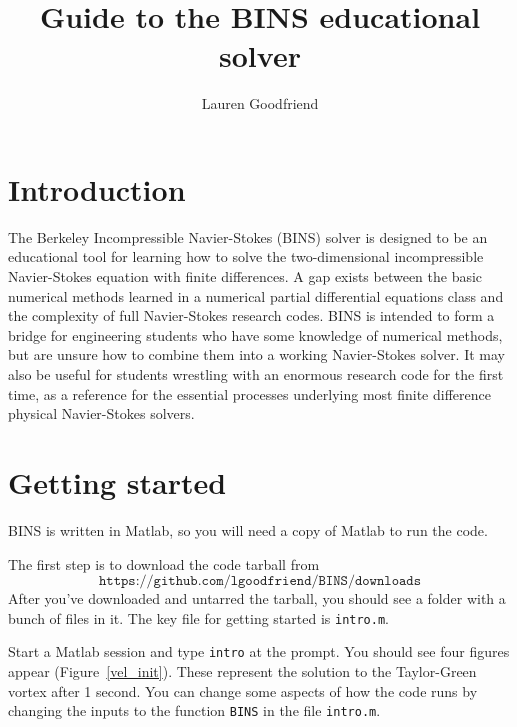 \documentclass[12pt]{article}
\author{Lauren Goodfriend}
\title{Guide to the BINS educational solver}
\begin{document}
\maketitle
\tableofcontents

\section{Introduction}

The Berkeley Incompressible Navier-Stokes (BINS) solver is designed to be an educational tool for learning how to solve the two-dimensional incompressible Navier-Stokes equation with finite differences.  A gap exists between the basic numerical methods learned in a numerical partial differential equations class and the complexity of full Navier-Stokes research codes.  BINS is intended to form a bridge for engineering students who have some knowledge of numerical methods, but are unsure how to combine them into a working Navier-Stokes solver.  It may also be useful for students wrestling with an enormous research code for the first time, as a reference for the essential processes underlying most finite difference physical Navier-Stokes solvers.

\section{Getting started}

BINS is written in Matlab, so you will need a copy of Matlab to run the code.

The first step is to download the code tarball from \[ \texttt{https://github.com/lgoodfriend/BINS/downloads}\]  After you've downloaded and untarred the tarball, you should see a folder with a bunch of files in it.  The key file for getting started is \texttt{intro.m}.

Start a Matlab session and type \texttt{intro} at the prompt.  You should see four figures appear (Figure~\ref{vel_init}).  These represent the solution to the Taylor-Green vortex after 1 second.  You can change some aspects of how the code runs by changing the inputs to the function \texttt{BINS} in the file \texttt{intro.m}.

\begin{center}
\begin{figure*}
\center
{}  
 \\
 \\
\caption{Results of running \texttt{intro.m}}
\label{vel_init}
\end{figure*}
\end{center}
\end{document}
